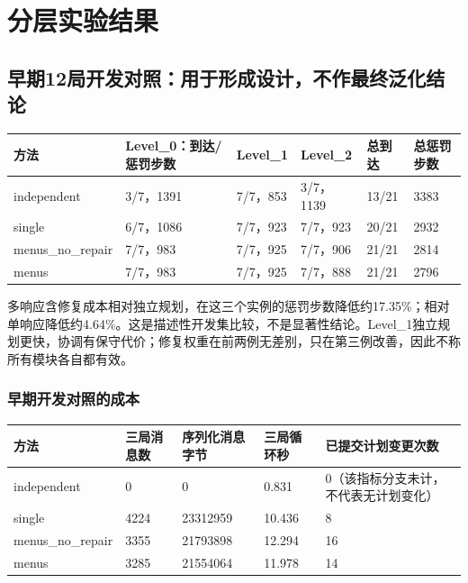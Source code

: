 \hypertarget{ux5206ux5c42ux5b9eux9a8cux7ed3ux679c}{%
\chapter{分层实验结果}\label{ux5206ux5c42ux5b9eux9a8cux7ed3ux679c}}

\hypertarget{ux65e9ux671f12ux5c40ux5f00ux53d1ux5bf9ux7167ux7528ux4e8eux5f62ux6210ux8bbeux8ba1ux4e0dux4f5cux6700ux7ec8ux6cdbux5316ux7ed3ux8bba}{%
\section{早期12局开发对照：用于形成设计，不作最终泛化结论}\label{ux65e9ux671f12ux5c40ux5f00ux53d1ux5bf9ux7167ux7528ux4e8eux5f62ux6210ux8bbeux8ba1ux4e0dux4f5cux6700ux7ec8ux6cdbux5316ux7ed3ux8bba}}

\begin{longtable}[]{@{}llllll@{}}
\toprule
方法 & Level\_0：到达/惩罚步数 & Level\_1 & Level\_2 & 总到达 & 总惩罚步数 \\
\midrule
\endhead
independent & 3/7，1391 & 7/7，853 & 3/7，1139 & 13/21 & 3383 \\
single & 6/7，1086 & 7/7，923 & 7/7，923 & 20/21 & 2932 \\
menus\_no\_repair & 7/7，983 & 7/7，925 & 7/7，906 & 21/21 & 2814 \\
menus & 7/7，983 & 7/7，925 & 7/7，888 & 21/21 & 2796 \\
\bottomrule
\end{longtable}

多响应含修复成本相对独立规划，在这三个实例的惩罚步数降低约17.35\%；相对单响应降低约4.64\%。这是描述性开发集比较，不是显著性结论。Level\_1独立规划更快，协调有保守代价；修复权重在前两例无差别，只在第三例改善，因此不称所有模块各自都有效。

\hypertarget{ux65e9ux671fux5f00ux53d1ux5bf9ux7167ux7684ux6210ux672c}{%
\subsection{早期开发对照的成本}\label{ux65e9ux671fux5f00ux53d1ux5bf9ux7167ux7684ux6210ux672c}}

\begin{longtable}[]{@{}lllll@{}}
\toprule
方法 & 三局消息数 & 序列化消息字节 & 三局循环秒 & 已提交计划变更次数 \\
\midrule
\endhead
independent & 0 & 0 & 0.831 & 0（该指标分支未计，不代表无计划变化） \\
single & 4224 & 23312959 & 10.436 & 8 \\
menus\_no\_repair & 3355 & 21793898 & 12.294 & 16 \\
menus & 3285 & 21554064 & 11.978 & 14 \\
\bottomrule
\end{longtable}


